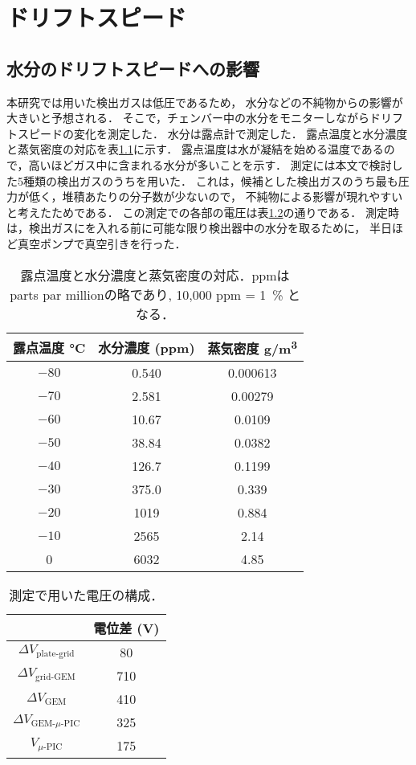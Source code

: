 \documentclass[../master]{subfiles}
\begin{document}
\chapter{ドリフトスピード}
\label{app::drift_speed_humid_dep}
\section{水分のドリフトスピードへの影響}
本研究では用いた検出ガスは低圧であるため，
水分などの不純物からの影響が大きいと予想される．
そこで，チェンバー中の水分をモニターしながらドリフトスピードの変化を測定した．
水分は露点計で測定した．
露点温度と水分濃度と蒸気密度の対応を表\ref{tab::dew_point_humidity}に示す．
露点温度は水が凝結を始める温度であるので，高いほどガス中に含まれる水分が多いことを示す．
測定には本文で検討した5種類の検出ガスのうち\Methane を用いた．
これは，候補とした検出ガスのうち最も圧力が低く，堆積あたりの分子数が少ないので，
不純物による影響が現れやすいと考えたためである．
この測定での各部の電圧は表\ref{tab::configuration_for_drift_dep}の通りである．
測定時は，検出ガスにを入れる前に可能な限り検出器中の水分を取るために，
半日ほど真空ポンプで真空引きを行った．
\begin{table}
  \centering
  \caption{露点温度と水分濃度と蒸気密度の対応．ppmはparts par millionの略であり, 10,000 ppm = \SI{1}{\percent} となる．}
  \label{tab::dew_point_humidity}
  \begin{tabular}{ccc}
    \toprule
    露点温度 \si{\degreeCelsius} & 水分濃度 (ppm) & 蒸気密度 \si{\gram/\cubic\metre} \\
    \midrule
    $-80$ & 0.540 & 0.000613 \\
    $-70$ & 2.581 & 0.00279 \\
    $-60$ & 10.67 & 0.0109 \\
    $-50$ & 38.84 & 0.0382 \\
    $-40$ & 126.7 & 0.1199 \\
    $-30$ & 375.0 & 0.339 \\
    $-20$ & 1019 & 0.884 \\
    $-10$ & 2565 & 2.14 \\
    0     & 6032 & 4.85 \\
    \bottomrule
  \end{tabular}
\end{table}
\begin{table}
  \centering
  \caption{測定で用いた電圧の構成．}
  \label{tab::configuration_for_drift_dep}
  \begin{tabular}{cc}
    \toprule
    & 電位差 (\si{\volt}) \\
    \midrule
    $\Delta V_{\text{plate-grid}}$ & 80 \\
    $\Delta V_{\text{grid-GEM}}$ & 710 \\
    $\Delta V_{\text{GEM}}$ & 410 \\
    $\Delta V_{\text{GEM-}\mu\text{-PIC}}$ & 325 \\
    $V_{\mu\text{-PIC}}$ & 175 \\
    \bottomrule
  \end{tabular}
\end{table}
\end{document}
